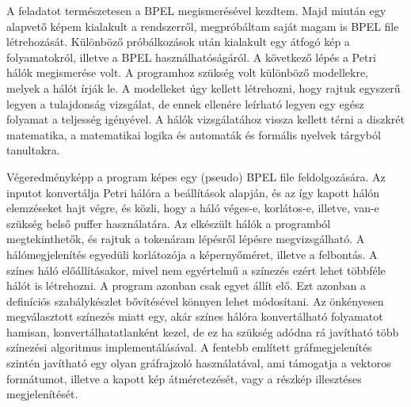 
A feladatot természetesen a BPEL megismerésével kezdtem. Majd miután egy alapvető képem kialakult a rendszerről, megpróbáltam saját magam is BPEL file létrehozását. Különböző próbálkozások után kialakult egy átfogó kép a folyamatokról, illetve a BPEL használhatóságáról. A következő lépés a Petri hálók megismerése volt. A programhoz szükség volt különböző modellekre, melyek a hálót írják le. A modelleket úgy kellett létrehozni, hogy rajtuk egyszerű legyen a tulajdonság vizsgálat, de ennek ellenére leírható legyen egy egész folyamat a teljesség igényével. 
A hálók vizsgálatához vissza kellett térni a diszkrét matematika, a matematikai logika és automaták és formális nyelvek tárgyból tanultakra. 

Végeredményképp a program képes egy (pseudo) BPEL file feldolgozására. Az inputot konvertálja Petri hálóra a beállítások alapján, és az így kapott hálón elemzéseket hajt végre, és közli, hogy a háló véges-e, korlátos-e, illetve, van-e szükség belső puffer használatára. Az elkészült hálók a programból megtekinthetők, és rajtuk a tokenáram lépésről lépésre megvizsgálható. A hálómegjelenítés egyedüli korlátozója a képernyőméret, illetve a felbontás.  A színes háló előállításakor, mivel nem egyértelmű a színezés ezért lehet többféle hálót is létrehozni. A program azonban csak egyet állít elő. Ezt azonban a definíciós szabálykészlet bővítésével könnyen lehet módosítani. Az önkényesen megválasztott színezés miatt egy, akár színes hálóra konvertálható folyamatot hamisan, konvertálhatatlanként kezel, de ez ha szükség adódna rá javítható több színezési algoritmus implementálásával. A fentebb említett gráfmegjelenítés szintén javítható egy olyan gráfrajzoló használatával, ami támogatja a vektoros formátumot, illetve a kapott kép átméretezését, vagy a részkép illesztéses megjelenítését. 